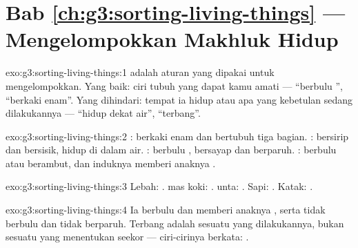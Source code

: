 \section*{Bab \ref{ch:g3:sorting-living-things} --- Mengelompokkan Makhluk Hidup}

\begin{solution}{exo:g3:sorting-living-things:1}
 adalah aturan yang dipakai untuk mengelompokkan. Yang baik:
ciri tubuh yang dapat kamu amati --- ``berbulu '', ``berkaki
enam''. Yang dihindari: tempat ia hidup atau apa yang kebetulan sedang
dilakukannya --- ``hidup dekat air'', ``terbang''.
\end{solution}

\begin{solution}{exo:g3:sorting-living-things:2}
: berkaki enam dan bertubuh tiga bagian. : bersirip dan
bersisik, hidup di dalam air. : berbulu , bersayap dan
berparuh. : berbulu atau berambut, dan induknya memberi anaknya
.
\end{solution}

\begin{solution}{exo:g3:sorting-living-things:3}
Lebah: .  mas koki: .  unta: . Sapi:
. Katak: .
\end{solution}

\begin{solution}{exo:g3:sorting-living-things:4}
Ia berbulu dan memberi anaknya , serta tidak berbulu  dan
tidak berparuh. Terbang adalah sesuatu yang dilakukannya, bukan
sesuatu yang menentukan seekor  --- ciri-cirinya berkata:
.
\end{solution}

